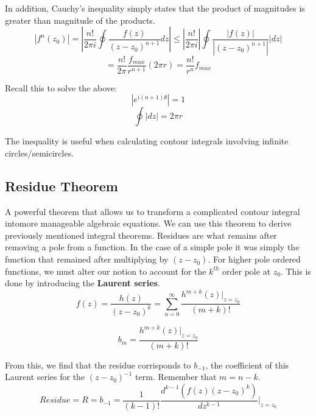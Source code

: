 \documentclass[12pt]{article}
\begin{document}
In addition, Cauchy's inequality simply states that the product of magnitudes is greater than magnitude of the products.
\begin{equation}
	|f^{n}(z_{0})| = |\frac{n!}{2\pi i} \oint \frac{f(z)}{(z-z_{0})^{n+1}}dz| \leq |\frac{n!}{2\pi i}| \oint \frac{|f(z)|}{|(z-z_{0})^{n+1}|}|dz| 
\end{equation}
\begin{equation}
    =\frac{n!}{2\pi} \frac{f_{max}}{r^{n+1}} (2\pi r) = \frac{n!}{r^{n}}f_{max}
\end{equation}

Recall this to solve the above:
\begin{equation}
    |e^{i(n+1)\theta}|=1
\end{equation}
\begin{equation}
    \oint|dz| = 2\pi r
\end{equation}

The inequality is useful when calculating contour integrals involving infinite circles/semicircles.

\subsection{Residue Theorem}
A powerful theorem that allows us to transform a complicated contour integral intomore manageable algebraic equations. We can use this theorem to derive previously mentioned integral theorems. Residues are what remains after removing a pole from a function. In the case of a simple pole it was simply the function that remained after multiplying by $(z-z_{0})$. For higher pole ordered functions, we must alter our notion to account for the $k^{th}$ order pole at $z_{0}$. This is done by introducing the \textbf{Laurent series}.
\begin{equation}
	f(z) = \frac{h(z)}{(z-z_{0})^{k}} = \sum_{n=0}^{\infty } \frac{h^{m+k}(z)|_{z=z_{0}}}{(m+k)!}
\end{equation}

\begin{equation}
	b_{m} = \frac{h^{m+k}(z)|_{z=z_{0}}}{(m+k)!}
\end{equation}

From this, we find that the residue corrisponds to $b_{-1}$, the coefficient of this Laurent series for the $(z-z_{0})^{-1}$ term. Remember that $m=n-k$.
\begin{equation}
	Residue = R = b_{-1} = \frac{1}{(k-1)!} \frac{d^{k-1}(f(z)(z-z_{0})^{k})}{dz^{k-1}}|_{z=z_{0}}
\end{equation}
\end{document}
